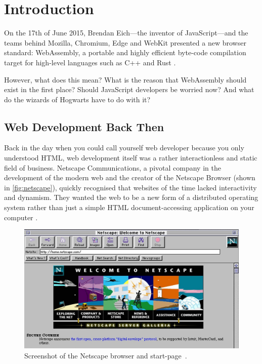 \documentclass[10pt]{article}  %
\newcommand{\floatcaption}[2]{\caption[#1.]{#1~#2.}}
\begin{document}
\begin{sloppypar}

  \section{Introduction}
  \label{sec:introduction}

  On the 17th of June 2015, Brendan Eich—the inventor of JavaScript—and the teams behind Mozilla, Chromium, Edge and WebKit presented a new browser standard: \mbox{WebAssembly}, a portable and highly efficient byte-code compilation target for high-level languages such as C++ and Rust \citep{eich_asmjs_2015}.

  However, what does this mean? What is the reason that WebAssembly should exist in the first place? Should JavaScript developers be worried now? And what do the wizards of Hogwarts have to do with it?

  \subsection{Web Development Back Then}
  \label{sec:back-then}

  Back in the day when you could call yourself web developer because you only understood HTML, web development itself was a rather interactionless and static field of business. Netscape Communications, a pivotal company in the development of the modern web and the creator of the Netscape Browser (shown in \autoref{fig:netscape}), quickly recognised that websites of the time lacked interactivity and dynamism. They wanted the web to be a new form of a distributed operating system rather than just a simple HTML document-accessing application on your computer \citep{cassel_brendan_2018}.

  \begin{figure}[ht]
    \centering
    \includegraphics[width=\textwidth]{figures/netscape.jpg}
    \floatcaption{Screenshot of the Netscape browser and start-page}{\citep{npr_home_nodate}}
    \label{fig:netscape}
  \end{figure}


\end{sloppypar}
\end{document}
